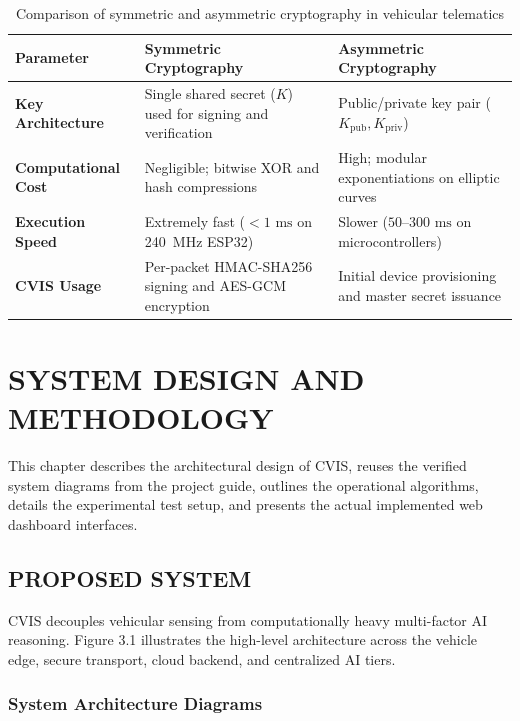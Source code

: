 \documentclass[12pt,a4paper]{report}
\begin{document}
\begin{table}[H]
\centering
\caption{Comparison of symmetric and asymmetric cryptography in vehicular telematics}
\label{tab:crypto_comparison}
\begin{tabularx}{\textwidth}{lXX}
\toprule
\textbf{Parameter} & \textbf{Symmetric Cryptography} & \textbf{Asymmetric Cryptography} \\
\midrule
\textbf{Key Architecture} & Single shared secret ($K$) used for signing and verification & Public/private key pair ($K_{\text{pub}}, K_{\text{priv}}$) \\
\addlinespace
\textbf{Computational Cost} & Negligible; bitwise XOR and hash compressions & High; modular exponentiations on elliptic curves \\
\addlinespace
\textbf{Execution Speed} & Extremely fast ($<1\text{ ms}$ on 240~MHz ESP32) & Slower ($50\text{--}300\text{ ms}$ on microcontrollers) \\
\addlinespace
\textbf{CVIS Usage} & Per-packet HMAC-SHA256 signing and AES-GCM encryption & Initial device provisioning and master secret issuance \\
\bottomrule
\end{tabularx}
\end{table}

\chapter{SYSTEM DESIGN AND METHODOLOGY}

This chapter describes the architectural design of CVIS, reuses the verified system diagrams from the project guide, outlines the operational algorithms, details the experimental test setup, and presents the actual implemented web dashboard interfaces.

\section{PROPOSED SYSTEM}
CVIS decouples vehicular sensing from computationally heavy multi-factor AI reasoning. Figure 3.1 illustrates the high-level architecture across the vehicle edge, secure transport, cloud backend, and centralized AI tiers.

\subsection{System Architecture Diagrams}
\end{document}
